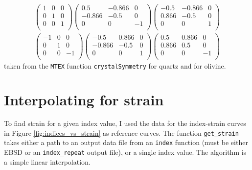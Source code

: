 \documentclass[a4paper,12pt,twoside]{report}
\numberwithin{equation}{chapter}
\begin{document}
\begin{equation}
\begin{multlined}
\begin{pmatrix}
1 & 0 & 0 \\
0 & 1 & 0 \\
0 & 0 & 1 \\
\end{pmatrix}
\begin{pmatrix}
0.5    & -0.866 & 0 \\
-0.866 & -0.5   & 0 \\
0      & 0      & -1 \\
\end{pmatrix}
\begin{pmatrix}
-0.5    & -0.866 & 0 \\
0.866  & -0.5   & 0 \\
0      & 0      & 1 \\
\end{pmatrix}
\\
\begin{pmatrix}
-1 & 0 &  0 \\
0  & 1 &  0 \\
0  & 0 & -1 \\
\end{pmatrix}
\begin{pmatrix}
-0.5    & 0.866 & 0 \\
-0.866  & -0.5   & 0 \\
0      & 0      & 1 \\
\end{pmatrix}
\begin{pmatrix}
0.5    & 0.866 & 0 \\
0.866  & 0.5   & 0 \\
0      & 0      & -1 \\
\end{pmatrix}
\end{multlined}
\end{equation}
\noindent
taken from the \texttt{MTEX} function \texttt{crystalSymmetry} for quartz and \cite{Randle2000} for olivine.

\section{Interpolating for strain} \label{App:strain}
To find strain for a given index value, I used the data for the index-strain curves in Figure \ref{fig:indices_vs_strain} as reference curves. The function \texttt{get\_{}strain} takes either a path to an output data file from an \texttt{index} function (must be either EBSD or an \texttt{index\_{}repeat} output file), or a single index value. The algorithm is a simple linear interpolation.
\end{document}
